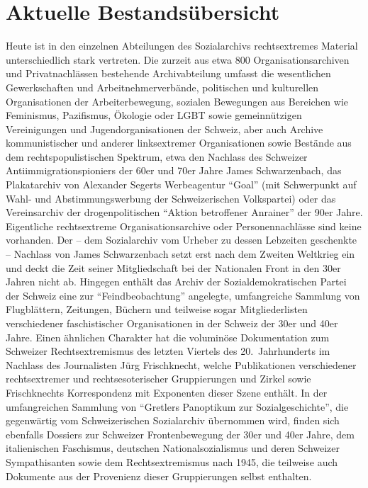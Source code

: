 \documentclass[a4paper,
fontsize=11pt,
oneside,
numbers=noperiodatend,
parskip=half-,
bibliography=totoc,
final
]{scrartcl}
\begin{document}
\hypertarget{aktuelle-bestandsuxfcbersicht}{%
\section{Aktuelle
Bestandsübersicht}\label{aktuelle-bestandsuxfcbersicht}}

Heute ist in den einzelnen Abteilungen des Sozialarchivs rechtsextremes
Material unterschiedlich stark vertreten. Die zurzeit aus etwa 800
Organisationsarchiven und Privatnachlässen bestehende Archivabteilung
umfasst die wesentlichen Gewerkschaften und Arbeitnehmerverbände,
politischen und kulturellen Organisationen der Arbeiterbewegung,
sozialen Bewegungen aus Bereichen wie Feminismus, Pazifismus, Ökologie
oder LGBT sowie gemeinnützigen Vereinigungen und Jugendorganisationen
der Schweiz, aber auch Archive kommunistischer und anderer linksextremer
Organisationen sowie Bestände aus dem rechtspopulistischen Spektrum,
etwa den Nachlass des Schweizer Antiimmigrationspioniers der 60er und
70er Jahre James Schwarzenbach, das Plakatarchiv von Alexander Segerts
Werbeagentur \enquote{Goal} (mit Schwerpunkt auf Wahl- und
Abstimmungswerbung der Schweizerischen Volkspartei) oder das
Vereinsarchiv der drogenpolitischen \enquote{Aktion betroffener
Anrainer} der 90er Jahre. Eigentliche rechtsextreme Organisationsarchive
oder Personennachlässe sind keine vorhanden. Der -- dem Sozialarchiv vom
Urheber zu dessen Lebzeiten geschenkte -- Nachlass von James
Schwarzenbach setzt erst nach dem Zweiten Weltkrieg ein und deckt die
Zeit seiner Mitgliedschaft bei der Nationalen Front in den 30er Jahren
nicht ab. Hingegen enthält das Archiv der Sozialdemokratischen Partei
der Schweiz eine zur \enquote{Feindbeobachtung} angelegte, umfangreiche
Sammlung von Flugblättern, Zeitungen, Büchern und teilweise sogar
Mitgliederlisten verschiedener faschistischer Organisationen in der
Schweiz der 30er und 40er Jahre. Einen ähnlichen Charakter hat die
voluminöse Dokumentation zum Schweizer Rechtsextremismus des letzten
Viertels des 20.~Jahrhunderts im Nachlass des Journalisten Jürg
Frischknecht, welche Publikationen verschiedener rechtsextremer und
rechtsesoterischer Gruppierungen und Zirkel sowie Frischknechts
Korrespondenz mit Exponenten dieser Szene enthält. In der umfangreichen
Sammlung von \enquote{Gretlers Panoptikum zur Sozialgeschichte}, die
gegenwärtig vom Schweizerischen Sozialarchiv übernommen wird, finden
sich ebenfalls Dossiers zur Schweizer Frontenbewegung der 30er und 40er
Jahre, dem italienischen Faschismus, deutschen Nationalsozialismus und
deren Schweizer Sympathisanten sowie dem Rechtsextremismus nach 1945,
die teilweise auch Dokumente aus der Provenienz dieser Gruppierungen
selbst enthalten.
\end{document}
